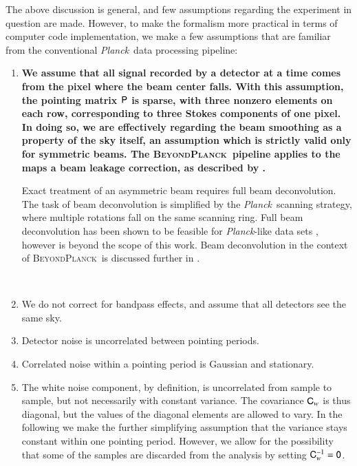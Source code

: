 \documentclass[twocolumn]{aa}
\newcommand{\ma}[1]{\tens{#1}}
\newcommand{\BP}{\textsc{BeyondPlanck}}
\def\Planck{\textit{Planck}}
\begin{document}
The above discussion is general, and few assumptions regarding the
experiment in question are made. However, to make the formalism more
practical in terms of computer code implementation, we make a few
assumptions that are familiar from the conventional \Planck\ data
processing pipeline:
\begin{enumerate}
\item {\bf We assume that all signal
  recorded by a detector at a time comes from the pixel where the beam center falls.
  With this assumption, the pointing matrix $\ma P$ is sparse, with three nonzero elements on each row, 
    corresponding to three Stokes components of one pixel. 
   In doing so, we are effectively regarding the beam smoothing as a property of the sky itself,
  an assumption which is strictly valid only for symmetric beams.
  The \BP\ pipeline applies to the maps a beam leakage correction, as described by \cite{bp09}. 

  Exact treatment of an asymmetric beam requires full beam deconvolution.
  The task of beam deconvolution is simplified by the \Planck\ scanning strategy,
  where multiple rotations fall on the same scanning ring. 
  Full beam deconvolution has been shown to be feasible for \Planck-like data sets \citep{keihanen2012},
   however is beyond the scope of this work.
  Beam deconvolution in the context of \BP\ is discussed further in \cite{bp10}.
  }
\\
\item We do not correct for bandpass effects, and assume that all detectors see the same sky. \\
\item Detector noise is uncorrelated between pointing periods. \\
\item Correlated noise within a pointing period is Gaussian and stationary.  \\
\item The white noise component, by definition, is uncorrelated from
  sample to sample, but not necessarily with constant variance. The
  covariance $\ma C_w$ is thus diagonal, but the values of the
  diagonal elements are allowed to vary. In the following we make the
  further simplifying assumption that the variance stays constant
  within one pointing period.  However, we allow for the possibility
  that some of the samples are discarded from the analysis by setting
  $\ma C_w^{-1}=\ma 0$.
\end{enumerate}
\end{document}
